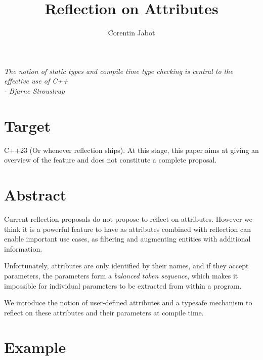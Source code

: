 \documentclass{wg21}
\title{Reflection on Attributes}
\author{Corentin Jabot}{corentin.jabot@gmail.com}
\begin{document}
\maketitle



\begin{flushright}
    \hfill \break
    \hfill \break
    \textit{The notion of static types and compile time type checking is central to the effective use of C++\\
    - Bjarne Stroustrup}
\end{flushright}


\section{Target}

C++23 (Or whenever reflection ships).
At this stage, this paper aims at giving an overview of the feature and does not constitute a complete proposal.

\section{Abstract}

Current reflection proposals do not propose to reflect on attributes. 
However we think it is a powerful feature to have as attributes combined with reflection can enable important use cases, as filtering and augmenting entities with additional information.

Unfortunately, attributes are only identified by their names, and if they accept parameters, the parameters form
a \emph{balanced token sequence}, which makes it impossible for individual parameters to be extracted from within a program.

We introduce the notion of user-defined attributes and a typesafe mechanism to reflect on these attributes and their parameters
at compile time.



\pagebreak

\section{Example}
\end{document}
